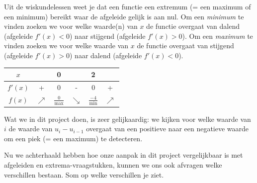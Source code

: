 Uit de wiskundelessen weet je dat een functie een extremum (= een maximum of een minimum) bereikt waar de afgeleide gelijk is aan nul. Om een \emph{minimum} te vinden zoeken we voor welke waarde(n) van $x$ de functie overgaat van dalend (afgeleide $f'(x)< 0$) naar stijgend (afgeleide $f'(x)> 0$). Om een \emph{maximum} te vinden zoeken we voor welke waarde van $x$ de functie overgaat van stijgend (afgeleide $f'(x)>0$) naar dalend (afgeleide $f'(x)<0$).


	\begin{center}
	\begin{tabular}{c|ccccc}
		$x$ & & 0 & & 2 & \\
		\hline 
		$f'(x)$ & + & 0 & - & 0 & + \\
		\hline
		$f(x)$ & $\nearrow$  & $\frac{0}{\text{max}}$ & $\searrow$ & $\frac{-4}{\text{min}}$ & $\nearrow$
	\end{tabular}
\end{center}


Wat we in dit project doen, is zeer gelijkaardig: we kijken voor welke waarde van $i$ de waarde van $u_{i}-u_{i-1}$ overgaat van een positieve naar een negatieve waarde om een piek (= een maximum) te detecteren. 

\begin{oef}
	Nu we achterhaald hebben hoe onze aanpak in dit project vergelijkbaar is met afgeleiden en extrema-vraagstukken, kunnen we ons ook afvragen welke verschillen bestaan. Som op welke verschillen je ziet.
\end{oef}

